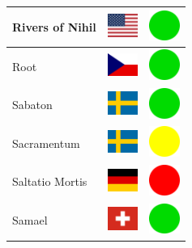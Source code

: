 \documentclass[12pt, a4paper, twoside]{report}
\begin{document}
\begin{center}
\begin{longtable}{|p{5cm}|p{2cm}|p{2cm}|}
			Rivers of Nihil & \includegraphics[width=1cm]{4x3/us} & \includegraphics[width=1cm]{likes/y} \\ \hline
			Root & \includegraphics[width=1cm]{4x3/cz} & \includegraphics[width=1cm]{likes/y} \\ \hline
			Sabaton & \includegraphics[width=1cm]{4x3/se} & \includegraphics[width=1cm]{likes/y} \\ \hline
			Sacramentum﻿ & \includegraphics[width=1cm]{4x3/se} & \includegraphics[width=1cm]{likes/m} \\ \hline
			Saltatio Mortis & \includegraphics[width=1cm]{4x3/de} & \includegraphics[width=1cm]{likes/n} \\ \hline
			Samael & \includegraphics[width=1cm]{4x3/ch} & \includegraphics[width=1cm]{likes/y} \\ \hline

\end{longtable}
\end{center}
\end{document}
